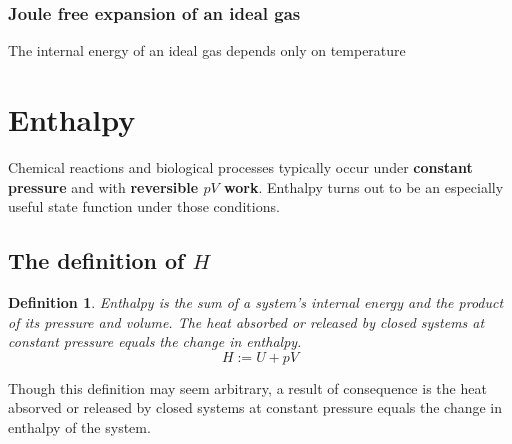 \documentclass{article}
\numberwithin{theorem}{section}
\numberwithin{corollary}{section}
\numberwithin{postulate}{section}
\numberwithin{lemma}{section}
\newtheorem{definition}{Definition}
\numberwithin{definition}{section}
\begin{document}
\subsubsection{Joule free expansion of an ideal gas}

\begin{tcolorbox}
  The internal energy of an ideal gas depends only on temperature
\end{tcolorbox}


\section{Enthalpy}

Chemical reactions and biological processes typically occur under
\textbf{constant pressure} and with \textbf{reversible $pV$ work}. Enthalpy
turns out to be an especially useful state function under those conditions.

\subsection{The definition of $H$ }

\begin{definition}
  Enthalpy is the sum of a system's internal energy and the product of its pressure and
  volume. The heat absorbed or released by closed systems at constant pressure
  equals the change in enthalpy.
  \begin{equation}
   H := U + pV
  \end{equation}
\end{definition}

Though this definition may seem arbitrary, a result of consequence is the heat
absorved or released by closed systems at constant pressure equals the change in
enthalpy of the system.
\end{document}
